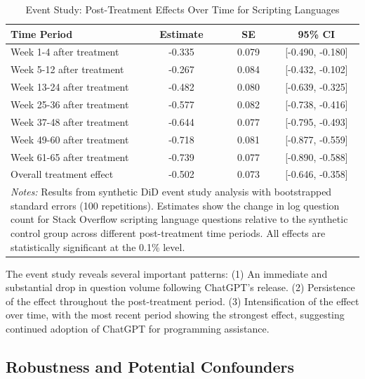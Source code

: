 \begin{table}[H]
    \centering
    \caption{Event Study: Post-Treatment Effects Over Time for Scripting Languages}
    \label{tab:event_study_results}
    \begin{tabular}{lccc}
    \toprule
    Time Period & Estimate & SE & 95\% CI \\
    \midrule
    Week 1-4 after treatment   & -0.335 & 0.079 & [-0.490, -0.180] \\
    Week 5-12 after treatment  & -0.267 & 0.084 & [-0.432, -0.102] \\
    Week 13-24 after treatment & -0.482 & 0.080 & [-0.639, -0.325] \\
    Week 25-36 after treatment & -0.577 & 0.082 & [-0.738, -0.416] \\
    Week 37-48 after treatment & -0.644 & 0.077 & [-0.795, -0.493] \\
    Week 49-60 after treatment & -0.718 & 0.081 & [-0.877, -0.559] \\
    Week 61-65 after treatment & -0.739 & 0.077 & [-0.890, -0.588] \\
    \midrule
    Overall treatment effect & -0.502 & 0.073 & [-0.646, -0.358] \\
    \bottomrule
    \multicolumn{4}{p{0.95\linewidth}}{\footnotesize \textit{Notes:} Results from synthetic DiD event study analysis with bootstrapped standard errors (100 repetitions). Estimates show the change in log question count for Stack Overflow scripting language questions relative to the synthetic control group across different post-treatment time periods. All effects are statistically significant at the 0.1\% level.} \\
    \end{tabular}
\end{table}

The event study reveals several important patterns: (1) An immediate and substantial drop in question volume following ChatGPT's release. (2) Persistence of the effect throughout the post-treatment period. (3) Intensification of the effect over time, with the most recent period showing the strongest effect, suggesting continued adoption of ChatGPT for programming assistance.


\subsection{Robustness and Potential Confounders}

